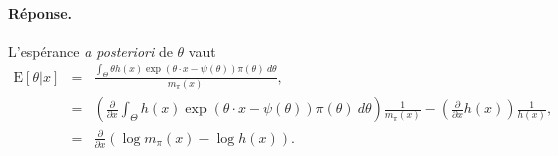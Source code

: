 \documentclass[10pt]{article}
\newcommand{\E}{\mbox{E}}
\newcommand{\1}{\mathbbm{1}}
\begin{document}
\paragraph{\bf Réponse.} L'espérance {\it a posteriori} de $\theta$ vaut
\begin{eqnarray*}
\E[\theta|x] & = & \frac{\int_{\Theta} \theta  h(x)\exp\left(\theta\cdot x - \psi(\theta)\right) \pi(\theta) \ d\theta}{m_{\pi}(x)}, \\
& = & \left(\frac{\partial }{\partial x} \int_{\Theta} h(x)\exp\left(\theta\cdot x - \psi(\theta)\right) \pi(\theta) \ d\theta\right) \frac{1}{m_{\pi}(x)} - \left(\frac{\partial }{\partial x}  h(x)\right) \frac{1}{h(x)}, \\
&= & \frac{\partial }{\partial x} \left( \log m_{\pi}(x) - \log h(x)\right).
\end{eqnarray*}
\end{document}
